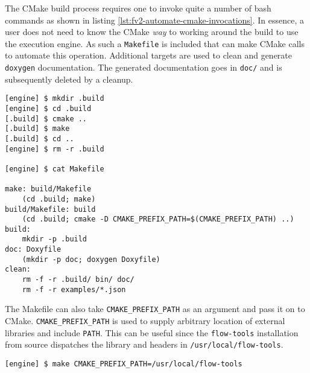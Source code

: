 The CMake build process requires one to invoke quite a number of bash commands
as shown in listing \ref{lst:fv2-automate-cmake-invocations}. In essence, a
user does not need to know the CMake \emph{way} to working around the build to
use the execution  engine. As such a
\texttt{Makefile} is included that can make CMake calls to automate this
operation. Additional targets are used to clean and generate \texttt{doxygen}
documentation. The generated documentation goes in \texttt{doc/} and is
subsequently deleted by a cleanup.

\begin{lstlisting}
[engine] $ mkdir .build
[engine] $ cd .build
[.build] $ cmake ..
[.build] $ make
[.build] $ cd ..
[engine] $ rm -r .build

[engine] $ cat Makefile

make: build/Makefile
    (cd .build; make)
build/Makefile: build
    (cd .build; cmake -D CMAKE_PREFIX_PATH=$(CMAKE_PREFIX_PATH) ..)
build:
    mkdir -p .build
doc: Doxyfile
    (mkdir -p doc; doxygen Doxyfile)
clean:
    rm -f -r .build/ bin/ doc/
    rm -f -r examples/*.json
\end{lstlisting}

The Makefile can also take \texttt{CMAKE\_PREFIX\_PATH} as an argument and
pass it on to CMake. \texttt{CMAKE\_PREFIX\_PATH} is used to supply arbitrary
 location of external libraries and include
\texttt{PATH}. This can be useful since the \texttt{flow-tools} installation
from source dispatches the library and headers in
\texttt{/usr/local/flow-tools}.

\begin{lstlisting}
[engine] $ make CMAKE_PREFIX_PATH=/usr/local/flow-tools
\end{lstlisting}






